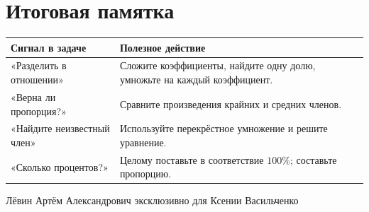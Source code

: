 \documentclass[a4paper,12pt]{article}
\begin{document}
\section*{Итоговая памятка}
\begin{center}
\renewcommand{\arraystretch}{1.4}
\begin{tabularx}{\linewidth}{@{}p{62mm}X@{}}
\toprule
\textbf{Сигнал в задаче} & \textbf{Полезное действие}\\
\midrule
«Разделить в отношении» & Сложите коэффициенты, найдите одну долю, умножьте на каждый коэффициент.\\
«Верна ли пропорция?» & Сравните произведения крайних и средних членов.\\
«Найдите неизвестный член» & Используйте перекрёстное умножение и решите уравнение.\\
«Сколько процентов?» & Целому поставьте в соответствие \(100\%\); составьте пропорцию.\\
\bottomrule
\end{tabularx}
\end{center}
\vfill
\begin{center}
\small\textcolor{muted}{Лёвин Артём Александрович эксклюзивно для Ксении Васильченко}
\end{center}
\end{document}
